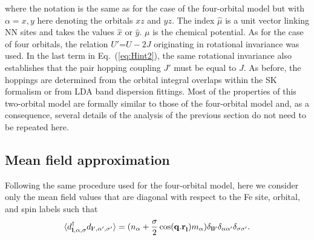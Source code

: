 \documentclass[aps,prb,superscriptaddress,preprintnumbers,
showpacs,legalpaper,twoside,twocolumn,amsmath,amssymb]{revtex4}
\begin{document}
where the notation is the same as for the case of the four-orbital model
but with $\alpha=x,y$ here denoting the orbitals $xz$ and $yz$.
The index $\hat\mu$ is a unit vector linking NN sites and takes the values
$\hat x$ or $\hat y$.
%
%
$\mu$ is the chemical potential. As for the case of four orbitals, the relation
$U'$=$U-2J$ originating in
rotational invariance\cite{RMP01} was used. In the
last term in Eq.~(\ref{eq:Hint2}), the same rotational invariance also establishes that
the pair hopping coupling $J'$ must be equal to $J$.
As before,
the hoppings are determined from the orbital integral overlaps within the
SK formalism or from LDA band
dispersion fittings.\cite{daghofer,scalapino}
Most of the properties of this two-orbital model are
formally similar to those of the four-orbital model and,
as a consequence, several details of the analysis of the previous section
do not need to be repeated here.


\subsection{Mean field approximation}

Following the same procedure used for the four-orbital model, here
we consider only the mean field values that are
diagonal with respect to the Fe site, orbital, and spin labels such that
\begin{equation}
\langle d^{\dagger}_{{\bf l},\alpha,\sigma}d_{{\bf l'},\alpha',\sigma'}\rangle=(n_{\alpha}
+{{\sigma}\over{2}}\cos({\bf q.r}_{\bf l})m_{\alpha})\delta_{\bf ll'}\delta_{\alpha\alpha'}
\delta_{\sigma\sigma'}.
\label{4}
\end{equation}
\end{document}
